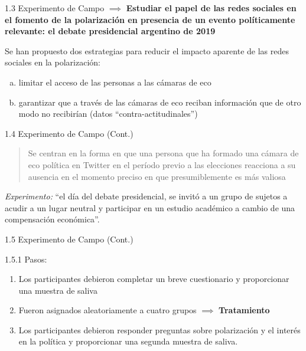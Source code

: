 \documentclass[
  11pt,
  ignorenonframetext,
  aspectratio=169,
]{beamer}
\providecommand{\tightlist}{%
  \setlength{\itemsep}{0pt}\setlength{\parskip}{0pt}}\usepackage{longtable,booktabs,array}
\begin{document}
\begin{frame}{1.3 Experimento de Campo}
\label{experimento-de-campo}
\(\implies\) \textbf{Estudiar el papel de las redes sociales en el
fomento de la polarización en presencia de un evento políticamente
relevante: el debate presidencial argentino de 2019}

Se han propuesto dos estrategias para reducir el impacto aparente de las
redes sociales en la polarización:

\begin{enumerate}
[a.]
\tightlist
\item
  limitar el acceso de las personas a las cámaras de eco
\item
  garantizar que a través de las cámaras de eco reciban información que
  de otro modo no recibirían (datos ``contra-actitudinales'')
\end{enumerate}
\end{frame}

\begin{frame}{1.4 Experimento de Campo (Cont.)}
\label{experimento-de-campo-cont.}
\begin{quote}
Se centran en la forma en que una persona que ha formado una cámara de
eco política en Twitter en el período previo a las elecciones reacciona
a su ausencia en el momento preciso en que presumiblemente es más
valiosa
\end{quote}

\emph{Experimento:} ``el día del debate presidencial, se invitó a un
grupo de sujetos a acudir a un lugar neutral y participar en un estudio
académico a cambio de una compensación económica''.
\end{frame}

\begin{frame}{1.5 Experimento de Campo (Cont.)}
\label{experimento-de-campo-cont.-1}
\begin{block}{1.5.1 Pasos:}
\label{pasos}
\begin{enumerate}
\tightlist
\item
  Los participantes debieron completar un breve cuestionario y
  proporcionar una muestra de saliva
\item
  Fueron asignados aleatoriamente a cuatro grupos \(\implies\)
  \textbf{Tratamiento}
\item
  Los participantes debieron responder preguntas sobre polarización y el
  interés en la política y proporcionar una segunda muestra de saliva.
\end{enumerate}
\end{block}
\end{frame}
\end{document}
